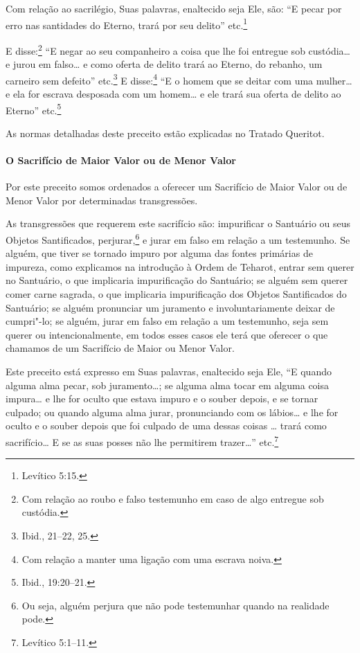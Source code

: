 \begin{multicols}{2}
Com relação ao sacrilégio, Suas palavras, enaltecido seja Ele, são: ``E
pecar por erro nas santidades do Eterno, trará por seu delito'' etc.\footnote{Levítico 5:15.}

E disse:\footnote{Com relação ao roubo e falso testemunho em caso de algo entregue sob
  custódia.} ``E negar ao seu companheiro a coisa que
lhe foi entregue sob custódia\ldots{} e jurou em falso\ldots{} e como
oferta de delito trará ao Eterno, do rebanho, um carneiro sem defeito''
etc.\footnote{Ibid., 21--22, 25.} E disse:\footnote{Com relação a manter uma ligação com uma escrava noiva.} ``E o homem que
se deitar com uma mulher\ldots{} e ela for escrava desposada com um
homem\ldots{} e ele trará sua oferta de delito ao Eterno'' etc.\footnote{Ibid.,
19:20--21.}

As normas detalhadas deste preceito estão explicadas no Tratado
Queritot\starr.

\paragraph{O Sacrifício de Maior Valor ou de Menor Valor}

Por este preceito somos ordenados a oferecer um Sacrifício de Maior
Valor ou de Menor Valor por determinadas transgressões.

As transgressões que requerem este sacrifício são: impurificar o
Santuário ou seus Objetos Santificados, perjurar,\footnote{Ou seja, alguém perjura que não pode testemunhar quando na realidade
  pode.} e
jurar em falso em relação a um testemunho. Se alguém, que tiver se
tornado impuro por alguma das fontes primárias de impureza, como explicamos na
introdução à Ordem de Teharot\starr, entrar sem querer no Santuário, o que
implicaria impurificação do Santuário; se alguém sem querer comer carne
sagrada, o que implicaria impurificação dos Objetos Santificados do
Santuário; se alguém pronunciar um juramento e involuntariamente deixar
de cumpri"-lo; se alguém, jurar em falso em relação a um testemunho, seja
sem querer ou intencionalmente, em todos esses casos ele terá que
oferecer o que chamamos de um Sacrifício de Maior ou Menor Valor.

Este preceito está expresso em Suas palavras, enaltecido seja Ele, ``E
quando alguma alma pecar, sob juramento\ldots{}; se alguma alma tocar em
alguma coisa impura\ldots{} e lhe for oculto que estava impuro e o souber
depois, e se tornar culpado; ou quando alguma alma jurar, pronunciando
com os lábios\ldots{} e lhe for oculto e o souber depois que foi culpado de
uma dessas coisas \ldots{} trará como sacrifício\ldots{} E se as suas posses não
lhe permitirem trazer\ldots{}'' etc.\footnote{Levítico 5:1--11.}


\end{multicols}
